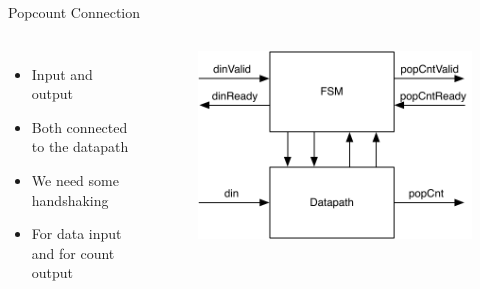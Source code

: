 \begin{frame}[fragile]{Popcount Connection}
\begin{columns}
\begin{itemize}
\item Input  and output 
\item Both connected to the datapath
\item We need some handshaking
\item For data input and for count output
\end{itemize}
\begin{figure}
  \includegraphics[scale=0.45]{../figures/popcnt-fsmd}
\end{figure}
\end{columns}
\end{frame}

